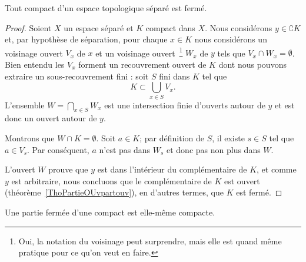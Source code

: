 \begin{proposition}\label{PropUCUknHx}
    Tout compact d'un espace topologique séparé est fermé.
\end{proposition}

\begin{proof}
    Soient \( X\) un espace séparé et \( K\) compact dans \( X\). Nous considérons \( y \in\complement K\) et, par hypothèse de séparation, pour chaque \( x\in K\) nous considérons un voisinage ouvert \( V_x\) de \( x\) et un voisinage ouvert~\footnote{Oui, la notation du voisinage peut surprendre, mais elle est quand même pratique pour ce qu'on veut en faire.} \( W_x\) de \( y\) tels que \( V_x\cap W_x=\emptyset\). Bien entendu les \( V_x\) forment un recouvrement ouvert de \( K\) dont nous pouvons extraire un sous-recouvrement fini : soit \( S\) fini dans \( K\) tel que
    \begin{equation}
        K\subset\bigcup_{x\in S}V_x.
    \end{equation}
    L'ensemble \( W=\bigcap_{x\in S}W_x\) est une intersection finie d'ouverts autour de \( y\) et est donc un ouvert autour de \( y\). 
    
    Montrons que \( W\cap K=\emptyset\). Soit \( a\in K\); par définition de \( S\), il existe \( s\in S\) tel que \( a\in V_s\). Par conséquent, \( a\) n'est pas dans \( W_s\) et donc pas non plus dans \( W\).
    

    L'ouvert \( W\) prouve que \( y\) est dans l'intérieur du complémentaire de \( K\), et comme \( y \) est arbitraire, nous concluons que le complémentaire de \( K\) est ouvert (théorème~\ref{ThoPartieOUvpartouv}), en d'autres termes, que \( K\) est fermé.
\end{proof}

\begin{lemma}   \label{LemnAeACf}
    Une partie fermée d'une compact est elle-même compacte.
\end{lemma}

